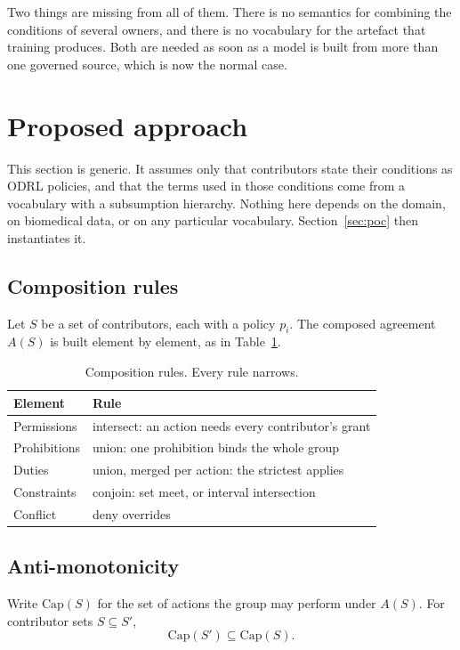 \documentclass[sigconf,anonymous,review]{acmart}
\begin{document}
Two things are missing from all of them. There is no semantics for combining the
conditions of several owners, and there is no vocabulary for the artefact that
training produces. Both are needed as soon as a model is built from more than one
governed source, which is now the normal case.

\section{Proposed approach}
\label{sec:approach}

This section is generic. It assumes only that contributors state their conditions
as ODRL policies, and that the terms used in those conditions come from a
vocabulary with a subsumption hierarchy. Nothing here depends on the domain, on
biomedical data, or on any particular vocabulary.
Section~\ref{sec:poc} then instantiates it.

\subsection{Composition rules}

Let $S$ be a set of contributors, each with a policy $p_i$. The composed
agreement $A(S)$ is built element by element, as in Table~\ref{tab:rules}.

\begin{table}[h]
\caption{Composition rules. Every rule narrows.}
\label{tab:rules}
\begin{tabular}{ll}
\toprule
Element & Rule \\
\midrule
Permissions & intersect: an action needs every contributor's grant \\
Prohibitions & union: one prohibition binds the whole group \\
Duties & union, merged per action: the strictest applies \\
Constraints & conjoin: set meet, or interval intersection \\
Conflict & deny overrides \\
\bottomrule
\end{tabular}
\end{table}

\subsection{Anti-monotonicity}

Write $\mathrm{Cap}(S)$ for the set of actions the group may perform under
$A(S)$. For contributor sets $S \subseteq S'$,
\[
\mathrm{Cap}(S') \subseteq \mathrm{Cap}(S).
\]
\end{document}
